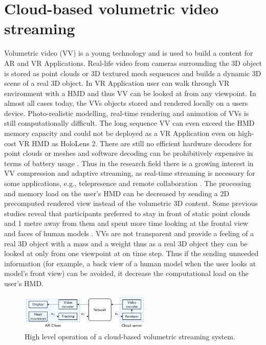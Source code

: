 \section{Cloud-based volumetric video streaming}
\label{sec:theorie:cloud}
Volumetric video (VV) is a young technology and is used to build a content for AR and VR Applications. Real-life video from cameras surrounding the 3D object is stored as point clouds or 3D textured mesh sequences and builds a dynamic 3D scene of a real 3D object. In VR Application user can walk through VR environment with a HMD and thus VV can be looked at from any viewpoint. In almost all cases today, the VVs objects stored and rendered locally on a users device. Photo-realistic modelling, real-time rendering and animation of VVs is still computationally difficult. The long sequence VV can even exceed the HMD memory capacity and could not be deployed as a VR Application even on high-cost VR HMD as HoloLens 2. There are still no efficient hardware decoders for point clouds or meshes and software decoding can be prohibitively expensive in terms of battery usage \cite{serhan_kalman}. Thus in the research field there is a growing interest in VV compression and adaptive streaming, as real-time streaming is necessary for some applications, e.g., telepresence and remote collaboration \cite{user_behav_volumetric}. The processing and memory load on the user's HMD can be decreased by sending a 2D precomputed rendered view instead of the volumetric 3D content. Some previous studies reveal that participants preferred to stay in front of static point clouds and 1 metre away from them and spent more time looking at the frontal view and faces of human models \cite{user_behav_volumetric}. VVs are not transparent and provide a feeling of a real 3D object with a mass and a weight thus as a real 3D object they can be looked at only from one viewpoint at on time step. Thus if the sending unneeded information (for example, a back view of a human model when the user looks at model's front view) can be avoided, it decrease the computational load on the user's HMD.
\begin{figure}
	\centering
	\includegraphics[width=0.56\textwidth]{gfx/cloud.png}
	\caption{\label{fig:cloud}High level operation of a cloud-based volumetric streaming system.}
\end{figure}

